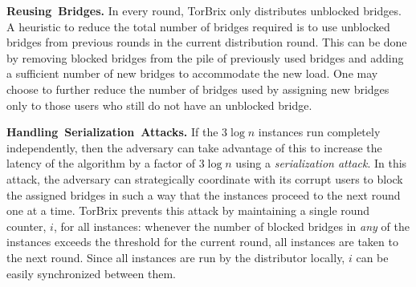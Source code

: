 \documentclass[letterpaper,twocolumn,10pt]{article}
\newcommand{\fullpaper}[1]{#1}
\newcommand{\fullpaper}[1]{}
\newcommand{\jared}[1]{}
\newcommand{\sfsize}{\fontsize{0.73\baselineskip}{0.73\baselineskip}\selectfont}
\newcommand{\sans}[1]{\textsf{\sfsize \mbox{#1}}}
\newcommand{\sansb}[1]{\textbf{\sans{\mbox{#1}}}}
\newcommand{\para}[1]{\vspace{0.55em} \noindent \sansb{{\mbox{#1}}}}
\newcommand{\brix}{\sans{TorBrix}\xspace}
\begin{document}
\para{Reusing Bridges.}
In every round, \brix only distributes unblocked bridges. A heuristic to reduce the total number of bridges required is to use unblocked bridges from previous rounds in the current distribution round. This can be done by removing blocked bridges from the pile of previously used bridges and adding a sufficient number of new bridges to accommodate the new load. One may choose to further reduce the number of bridges used by assigning new bridges only to those users who still do not have an unblocked bridge. %



\para{Handling Serialization Attacks.} If the $3\log{n}$ instances run completely independently, then the adversary can take advantage of this to increase the latency of the algorithm by a factor of $3\log{n}$ using a \emph{serialization attack}. In this attack, the adversary can strategically coordinate with its corrupt users to block the assigned bridges in such a way that the instances proceed to the next round one at a time. 
\brix prevents this attack by maintaining a single round counter, $i$, for all instances: whenever the number of blocked bridges in \emph{any} of the instances exceeds the threshold for the current round, all instances are taken to the next round. Since all instances are run by the distributor locally, $i$ can be easily synchronized between them. %
\end{document}
